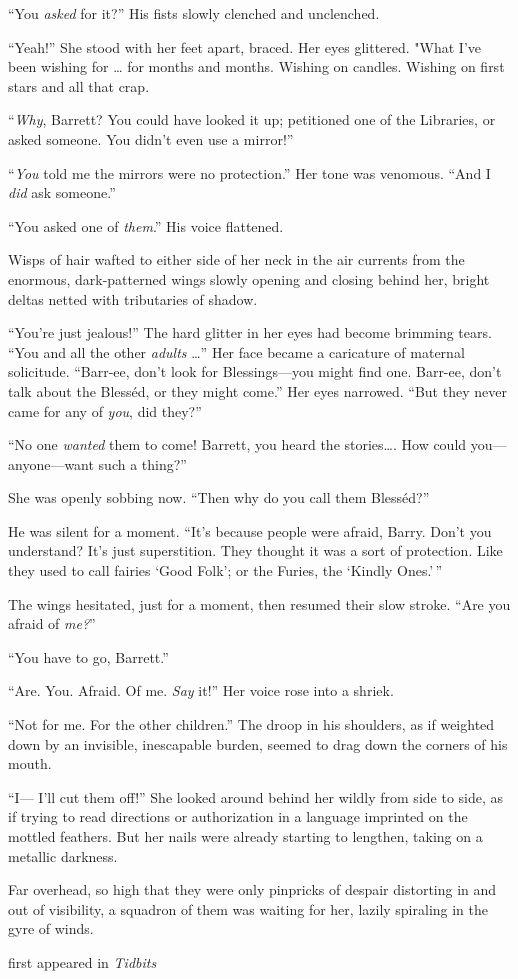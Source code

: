 
``You \emph{asked} for it?'' His fists slowly clenched and unclenched.

``Yeah!'' She stood with her feet apart, braced. Her eyes glittered.
"What I've been wishing for \ldots{} for months and months. Wishing on
candles. Wishing on first stars and all that crap.

``\emph{Why}, Barrett? You could have looked it up; petitioned one of
the Libraries, or asked someone. You didn't even use a mirror!''

``\emph{You} told me the mirrors were no protection.'' Her tone was
venomous. ``And I \emph{did} ask someone.''

``You asked one of \emph{them}.'' His voice flattened.

Wisps of hair wafted to either side of her neck in the air currents from
the enormous, dark-patterned wings slowly opening and closing behind
her, bright deltas netted with tributaries of shadow.

``You're just jealous!'' The hard glitter in her eyes had become
brimming tears. ``You and all the other \emph{adults} \ldots{}'' Her
face became a caricature of maternal solicitude. ``Barr-ee, don't look
for Blessings---you might find one. Barr-ee, don't talk about the
Blesséd, or they might come.'' Her eyes narrowed. ``But they never came
for any of \emph{you}, did they?''

``No one \emph{wanted} them to come! Barrett, you heard the
stories\ldots{}. How could you---anyone---want such a thing?''

She was openly sobbing now. ``Then why do you call them Blesséd?''

He was silent for a moment. ``It's because people were afraid, Barry.
Don't you understand? It's just superstition. They thought it was a sort
of protection. Like they used to call fairies `Good Folk'; or the
Furies, the `Kindly Ones.'\,''

The wings hesitated, just for a moment, then resumed their slow stroke.
``Are you afraid of \emph{me?}''

``You have to go, Barrett.''

``Are. You. Afraid. Of me. \emph{Say} it!'' Her voice rose into a
shriek.

``Not for me. For the other children.'' The droop in his shoulders, as
if weighted down by an invisible, inescapable burden, seemed to drag
down the corners of his mouth.

``I--- I'll cut them off!'' She looked around behind her wildly from
side to side, as if trying to read directions or authorization in a
language imprinted on the mottled feathers. But her nails were already
starting to lengthen, taking on a metallic darkness.

Far overhead, so high that they were only pinpricks of despair
distorting in and out of visibility, a squadron of them was waiting for
her, lazily spiraling in the gyre of winds.

first appeared in \emph{Tidbits}

